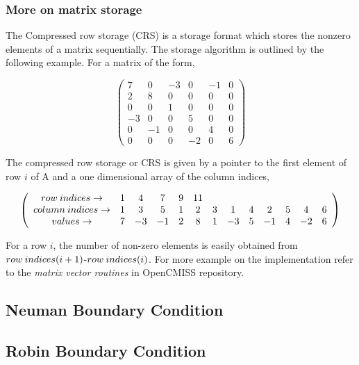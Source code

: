 \subsubsection{More on matrix storage}


The Compressed row storage (CRS) is a storage format which stores the nonzero elements of a matrix sequentially. 
The storage algorithm is outlined by the following example. For a matrix of the form,

\[ \left( \begin{array}{cccccc}
 7 & 0 &-3 & 0 &-1 & 0 \\
 2 & 8 & 0 & 0 & 0 & 0 \\
 0 & 0 & 1 & 0 & 0 & 0 \\
-3 & 0 & 0 & 5 & 0 & 0 \\
 0 &-1 & 0 & 0 & 4 & 0 \\
 0 & 0 & 0 &-2 & 0 & 6 \end{array} \right)\] 

The compressed row storage or CRS is given by a pointer to the first element of row $i$ of A and a one dimensional array of the column indices,

\[ \left( \begin{array}{cccccccccccccc}
 row \hspace{0.8mm} indices \rightarrow & 1 & 4 & 7 & 9 & 11&   &  &   &   &   &   &  \\
 column \hspace{0.8mm} indices \rightarrow & 1 & 3 & 5 & 1 & 2 & 3 & 1& 4 & 2 & 5 & 4 & 6 \\
 values \rightarrow & 7 &-3 &-1 & 2 & 8 & 1 & -3 & 5 & -1 & 4 & -2& 6 \end{array} \right)\]
 
 
For a row $i$, the number of non-zero elements is easily obtained from $row \hspace{0.8mm} indices(i+1)$-$row \hspace{0.8mm} indices(i)$. For more example on the implementation
 refer to the \textit{matrix vector routines} in OpenCMISS repository.

\subsection{Neuman Boundary Condition}

\subsection{Robin Boundary Condition}
